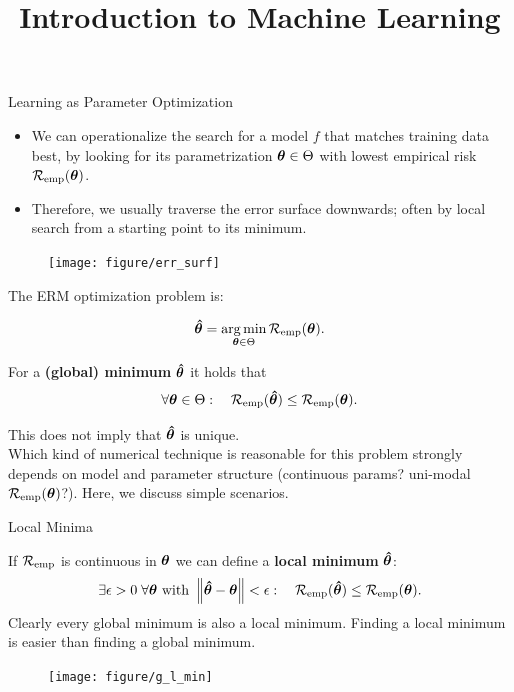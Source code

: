 \documentclass[11pt,compress,t,notes=noshow, xcolor=table]{beamer}
\title{Introduction to Machine Learning}
\begin{document}


\begin{vbframe}{Learning as Parameter Optimization}
\begin{itemize}
\item We can operationalize the search for a model $f$ that matches
    training data best, by looking for its parametrization $\bm{\theta} \in \Theta$
    with lowest empirical risk $\mathcal{R}_{\text{emp}}(\bm{\theta})$.
\item Therefore, we usually traverse the error surface downwards; often by local search from a starting point to its minimum.
\end{itemize}
\begin{center}
\begin{figure}[!b]
\texttt{[image: figure/err\_surf]}
\end{figure}
\end{center}

\framebreak

The ERM optimization problem is:

\[
\bm{\hat\theta}  = \mathop{\mathrm{arg\,min}}_{\bm{\theta} \in \Theta} \mathcal{R}_{\text{emp}}(\bm{\theta}) .
\]

For a \textbf{(global) minimum} $\bm{\hat\theta}$ it  holds that 
\[
\forall \bm{\theta} \in \Theta :\quad \mathcal{R}_{\text{emp}}(\bm{\hat\theta}) \leq \mathcal{R}_{\text{emp}}(\bm{\theta}) .
\]

This does not imply that $\bm{\hat\theta}$ is unique. \\
\lz
Which kind of numerical technique is reasonable for this problem strongly depends 
on model and parameter structure (continuous params? uni-modal $\mathcal{R}_{\text{emp}}(\bm{\theta})$?). 
Here, we discuss simple scenarios.

\end{vbframe}
\begin{vbframe}{Local Minima}

If $\mathcal{R}_{\text{emp}}$ is continuous in $\bm{\theta}$ we can define a \textbf{local minimum} $\bm{\hat\theta}$:
\[
\exists \epsilon > 0\; \forall \bm{\theta} \text{ with } \left\Vert\bm{\hat\theta} - \bm{\theta}\right\Vert < \epsilon: \quad \mathcal{R}_{\text{emp}}(\bm{\hat\theta}) \leq \mathcal{R}_{\text{emp}}(\bm{\theta}) .
\]
Clearly every global minimum is also a local minimum.
Finding a local minimum is easier than finding a global minimum.

\begin{center}
\begin{figure}[!b]
\texttt{[image: figure/g\_l\_min]}
\end{figure}
\end{center}

\end{vbframe}
\end{document}
